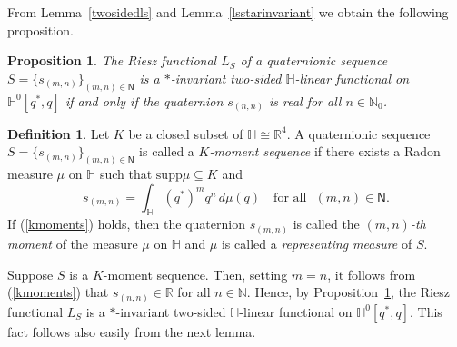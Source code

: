 \documentclass[11pt,a4paper]{amsart}
\newtheorem{proposition}[theorem]{Proposition}
\theoremstyle{definition}
\newtheorem{definition}[theorem]{Definition}
\begin{document}
From Lemma~\ref{twosidedls} and Lemma~\ref{lsstarinvariant} we obtain the
following proposition.
%
\begin{proposition}%
\label{Riesztwosided}
The Riesz functional $L_{S}$ of a quaternionic sequence
$S=\{s_{(m,n)}\}_{(m,n) \in \mathsf{{N}}}$ is a $*$-invariant two-sided
$\mathbb{H}$-linear functional on $\mathbb{H}^{0}[q^{*}, q]$ if and only
if the quaternion $s_{(n,n)}$ is real for all $n\in \mathbb{N}_{0}$.
\end{proposition}

\begin{definition}%
\label{momentsequence}
Let $K$ be a closed subset of $\mathbb{H}\cong \mathbb{R}^{4}$. A quaternionic
sequence $S=\{s_{(m,n)}\}_{(m,n) \in \mathsf{{N}}}$ is called a
\emph{$K$-moment sequence} if there exists a Radon measure $\mu $ on
$\mathbb{H}$ such that $\mathrm{supp}\mu \subseteq K$ and
%
\begin{equation}
\label{kmoments}
s_{(m,n)} = \int _{\mathbb{H}} (q^{*})^{m} q^{n}\, d\mu (q)\quad
\text{for all}~~~ (m,n) \in \mathsf{{N}.
}\end{equation}
%
If (\ref{kmoments}) holds, then the quaternion $s_{(m,n)} $ is called the
\emph{$(m,n)$-th moment }of the measure $\mu $ on $\mathbb{H}$ and
$\mu $ is called a \emph{representing measure} of $S$.
\end{definition}

Suppose $S$ is a $K$-moment sequence. Then, setting $m=n$, it follows from
(\ref{kmoments}) that $s_{(n,n)} \in \mathbb{R}$ for all
$n\in \mathbb{N}$. Hence, by Proposition~\ref{Riesztwosided}, the Riesz
functional $L_{S}$ is a $*$-invariant two-sided $\mathbb{H}$-linear functional
on $\mathbb{H}^{0}[q^{*}, q]$. This fact follows also easily from the next
lemma.
\end{document}
